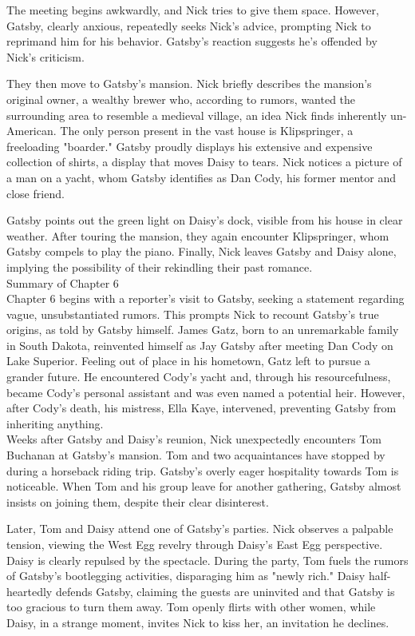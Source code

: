 \begin{tcolorbox}[title = {History}, breakable]
The meeting begins awkwardly, and Nick tries to give them space. However, Gatsby, clearly anxious, repeatedly seeks Nick's advice, prompting Nick to reprimand him for his behavior.  Gatsby's reaction suggests he's offended by Nick's criticism.

They then move to Gatsby's mansion. Nick briefly describes the mansion's original owner, a wealthy brewer who, according to rumors, wanted the surrounding area to resemble a medieval village, an idea Nick finds inherently un-American.  The only person present in the vast house is Klipspringer, a freeloading "boarder."  Gatsby proudly displays his extensive and expensive collection of shirts, a display that moves Daisy to tears.  Nick notices a picture of a man on a yacht, whom Gatsby identifies as Dan Cody, his former mentor and close friend.

Gatsby points out the green light on Daisy's dock, visible from his house in clear weather.  After touring the mansion, they again encounter Klipspringer, whom Gatsby compels to play the piano.  Finally, Nick leaves Gatsby and Daisy alone, implying the possibility of their rekindling their past romance.
\\Summary of Chapter 6 \\
Chapter 6 begins with a reporter's visit to Gatsby, seeking a statement regarding vague, unsubstantiated rumors.  This prompts Nick to recount Gatsby's true origins, as told by Gatsby himself.  James Gatz, born to an unremarkable family in South Dakota, reinvented himself as Jay Gatsby after meeting Dan Cody on Lake Superior.  Feeling out of place in his hometown, Gatz left to pursue a grander future.  He encountered Cody's yacht and, through his resourcefulness, became Cody's personal assistant and was even named a potential heir. However, after Cody's death, his mistress, Ella Kaye, intervened, preventing Gatsby from inheriting anything.\\
Weeks after Gatsby and Daisy's reunion, Nick unexpectedly encounters Tom Buchanan at Gatsby's mansion. Tom and two acquaintances have stopped by during a horseback riding trip. Gatsby's overly eager hospitality towards Tom is noticeable. When Tom and his group leave for another gathering, Gatsby almost insists on joining them, despite their clear disinterest.

Later, Tom and Daisy attend one of Gatsby's parties. Nick observes a palpable tension, viewing the West Egg revelry through Daisy's East Egg perspective.  Daisy is clearly repulsed by the spectacle.  During the party, Tom fuels the rumors of Gatsby's bootlegging activities, disparaging him as "newly rich."  Daisy half-heartedly defends Gatsby, claiming the guests are uninvited and that Gatsby is too gracious to turn them away.  Tom openly flirts with other women, while Daisy, in a strange moment, invites Nick to kiss her, an invitation he declines.


\end{tcolorbox}
